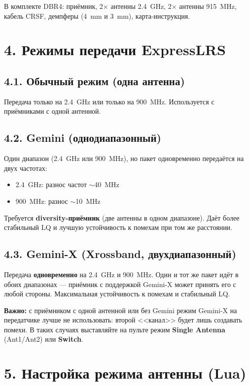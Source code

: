 \documentclass[a4paper,11pt]{article}
\begin{document}
В комплекте DBR4: приёмник, 2$\times$ антенны 2.4~GHz, 2$\times$ антенны 915~MHz, кабель CRSF, демпферы (4~mm и 3~mm), карта-инструкция.

\section{4. Режимы передачи ExpressLRS}

\subsection{4.1. Обычный режим (одна антенна)}

Передача только на 2.4~GHz или только на 900~MHz. Используется с приёмниками с одной антенной.

\subsection{4.2. Gemini (однодиапазонный)}

Один диапазон (2.4~GHz или 900~MHz), но пакет одновременно передаётся на двух частотах:
\begin{itemize}[nosep]
  \item 2.4~GHz: разнос частот $\sim$40~MHz
  \item 900~MHz: разнос $\sim$10~MHz
\end{itemize}

Требуется \textbf{diversity-приёмник} (две антенны в одном диапазоне). Даёт более стабильный LQ и лучшую устойчивость к помехам при том же расстоянии.

\subsection{4.3. Gemini-X (Xrossband, двухдиапазонный)}

Передача \textbf{одновременно} на 2.4~GHz и 900~MHz. Один и тот же пакет идёт в обоих диапазонах --- приёмник с поддержкой Gemini-X может принять его с любой стороны. Максимальная устойчивость к помехам и стабильный LQ.

\textbf{Важно:} с приёмником с одной антенной или без Gemini режим Gemini-X на передатчике лучше не использовать: второй <<канал>> будет лишь создавать помехи. В таких случаях выставляйте на пульте режим \textbf{Single Antenna} (Ant1/Ant2) или \textbf{Switch}.

\section{5. Настройка режима антенны (Lua)}
\end{document}
